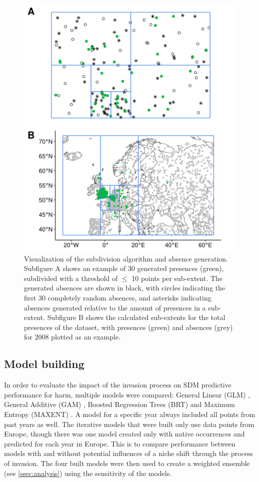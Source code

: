 \documentclass[12pt,a4paper]{article}
\begin{document}
\begin{figure}[!h]
    \centering
    \includegraphics[width = 0.8\linewidth]{"../../R/figures/ext-subdiv.png"}
    \caption{\label{fig:ext_subdiv} Visualization of the subdivision algorithm and absence generation. Subfigure A shows an example of 30 generated presences (green), subdivided with a threshold of $\leq$ 10 points per sub-extent. The generated absences are shown in black, with circles indicating the first 30 completely random absences, and asterisks indicating absences generated relative to the amount of presences in a sub-extent. Subfigure B shows the calculated sub-extents for the total presences of the dataset, with presences (green) and absences (grey) for 2008 plotted as an example.}
\end{figure}

\subsection{Model building} \label{ssec:modelbuilding}

In order to evaluate the impact of the invasion process on SDM predictive performance for \gls{harm}, multiple models were compared: General Linear (GLM) \autocite{guisan2002glm-gam}, General Additive (GAM) \autocite{guisan2002glm-gam}, Boosted Regression Trees (BRT) \autocite{elith2008brt} and Maximum Entropy (MAXENT) \autocite{phillips2017maxnet}.
A model for a specific year always included all points from past years as well.
The iterative models that were built only use data points from Europe, though there was one model created only with native occurrences and predicted for each year in Europe.
This is to compare performance between models with and without potential influences of a niche shift through the process of invasion.
The four built models were then used to create a weighted ensemble (see \ref{ssec:analysis}) using the sensitivity of the models.
\end{document}
